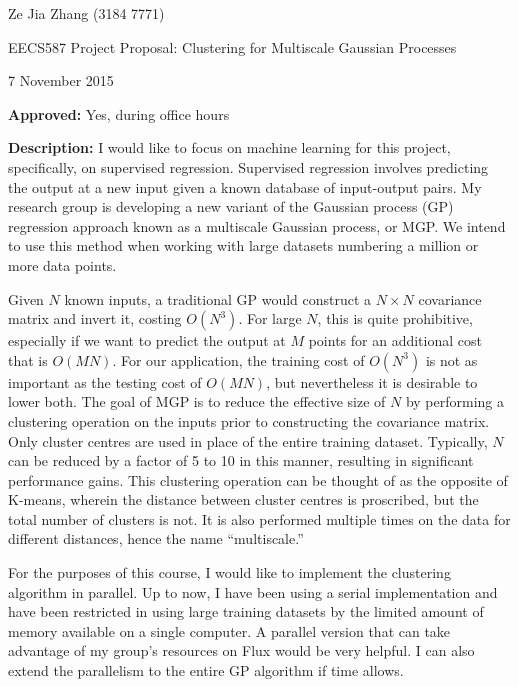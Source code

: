 \documentclass[11pt,a4paper,notitlepage]{article}
\begin{document}

\begin{center}
\large Ze Jia Zhang (3184 7771) 


\Large EECS587 Project Proposal: Clustering for Multiscale Gaussian Processes

\normalsize 7 November 2015
\end{center}

\textbf{Approved:} Yes, during office hours

\textbf{Description:} I would like to focus on machine learning for this project, specifically, on supervised regression. Supervised regression involves predicting the output at a new input given a known database of input-output pairs. My research group is developing a new variant of the Gaussian process (GP) regression approach known as a multiscale Gaussian process, or MGP. We intend to use this method when working with large datasets numbering a million or more data points.

Given $N$ known inputs, a traditional GP would construct a $N\times N$ covariance matrix and invert it, costing $O(N^3)$. For large $N$, this is quite prohibitive, especially if we want to predict the output at $M$ points for an additional cost that is $O(MN)$. For our application, the training cost of $O(N^3)$ is not as important as the testing cost of $O(MN)$, but nevertheless it is desirable to lower both. The goal of MGP is to reduce the effective size of $N$ by performing a clustering operation on the inputs prior to constructing the covariance matrix. Only cluster centres are used in place of the entire training dataset. Typically, $N$ can be reduced by a factor of 5 to 10 in this manner, resulting in significant performance gains. This clustering operation can be thought of as the opposite of K-means, wherein the distance between cluster centres is proscribed, but the total number of clusters is not. It is also performed multiple times on the data for different distances, hence the name ``multiscale.''

For the purposes of this course, I would like to implement the clustering algorithm in parallel. Up to now, I have been using a serial implementation and have been restricted in using large training datasets by the limited amount of memory available on a single computer. A parallel version that can take advantage of my group's resources on Flux would be very helpful. I can also extend the parallelism to the entire GP algorithm if time allows.
\end{document}
